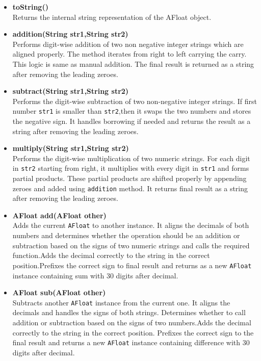 \documentclass{article}
\begin{document}
\begin{itemize}
    \item \textbf{toString()} \\
    Returns the internal string representation of the AFloat object.

    \item \textbf{addition(String str1,String str2)} \\
    Performs digit-wise addition of two non negative integer strings which are aligned properly. The method iterates from right to left carrying the carry.\\This logic is same as manual addition. The final result is returned as a string after removing the leading zeroes.

    \item \textbf{subtract(String str1,String str2)} \\
    Performs the digit-wise subtraction of two non-negative integer strings. If first number \texttt{str1} is smaller than \texttt{str2},then it swaps the two numbers and stores the negative sign. It handles borrowing if needed and returns the result as a string after removing the leading zeroes.

    \item \textbf{multiply(String str1,String str2)} \\
    Performs the digit-wise multiplication of two numeric strings. For each digit in \texttt{str2} starting from right, it multiplies with every digit in \texttt{str1} and forms partial products. These partial products are shifted properly by appending zeroes and added using \texttt{addition} method. It returns final result as a string after removing the leading zeroes.

    \item \textbf{AFloat add(AFloat other)} \\
    Adds the current \texttt{AFloat} to another instance. It aligns the decimals of both numbers and determines whether the operation should be an addition or subtraction based on the signs of two numeric strings and calls the required function.Adds the decimal correctly to the string in the correct position.Prefixes the correct sign to final result and returns as a new \texttt{AFloat} instance containing sum with 30 digits after decimal.

    \item \textbf{AFloat sub(AFloat other)} \\
    Subtracts another \texttt{AFloat} instance from the current one. It aligns the decimals and handles the signs of both strings. Determines whether to call addition or subtraction based on the signs of two numbers.Adds the decimal correctly to the string in the correct position. Prefixes the correct sign to the final result and returns a new \texttt{AFloat} instance containing difference with 30 digits after decimal.


\end{itemize}
\end{document}
